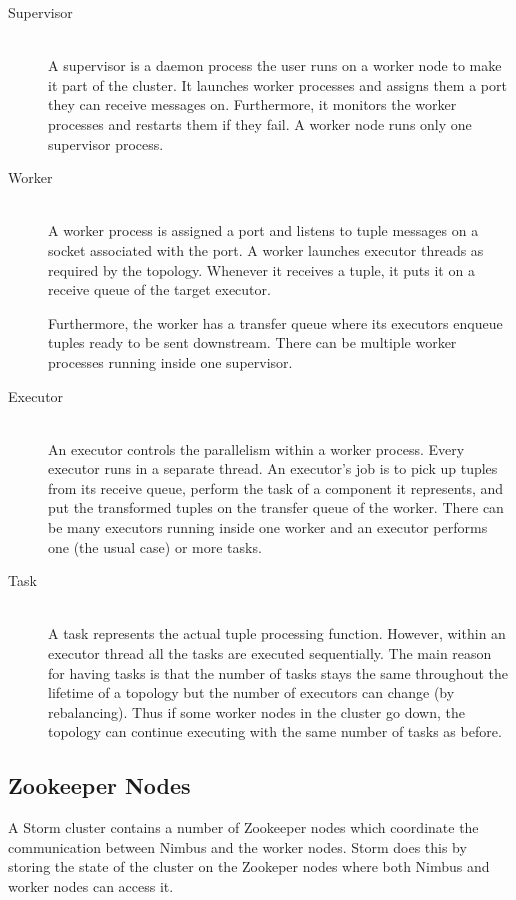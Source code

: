 \documentclass[bsc,twoside,singlespacing,normalheadings,parskip]{infthesis}\usepackage[]{graphicx}\usepackage[]{color}
\begin{document}
\begin{description}
	\item[Supervisor] \hfill \\
	A supervisor is a daemon process the user runs on a worker node to make it part of the cluster. It launches worker processes and assigns them a port they can receive messages on. Furthermore, it monitors the worker processes and restarts them if they fail. A worker node runs only one supervisor process.
	\item[Worker] \hfill \\
	A worker process is assigned a port and listens to tuple messages on a socket associated with the port. A worker launches executor threads as required by the topology. Whenever it receives a tuple, it puts it on a receive queue of the target executor.
	
	Furthermore, the worker has a transfer queue where its executors enqueue tuples ready to be sent downstream. There can be multiple worker processes running inside one supervisor.
	\item[Executor] \hfill \\
	An executor controls the parallelism within a worker process. Every executor runs in a separate thread. An executor's job is to pick up tuples from its receive queue, perform the task of a component it represents, and put the transformed tuples on the transfer queue of the worker. There can be many executors running inside one worker and an executor performs one (the usual case) or more tasks.
	\item[Task] \hfill \\
	A task represents the actual tuple processing function. However, within an executor thread all the tasks are executed sequentially. The main reason for having tasks is that the number of tasks stays the same throughout the lifetime of a topology but the number of executors can change (by rebalancing). Thus if some worker nodes in the cluster go down, the topology can continue executing with the same number of tasks as before.
\end{description}

\subsection{Zookeeper Nodes}
\label{subsec:zookeeper}

A Storm cluster contains a number of Zookeeper nodes which coordinate the communication between Nimbus and the worker nodes. Storm does this by storing the state of the cluster on the Zookeper nodes where both Nimbus and worker nodes can access it.
\end{document}

